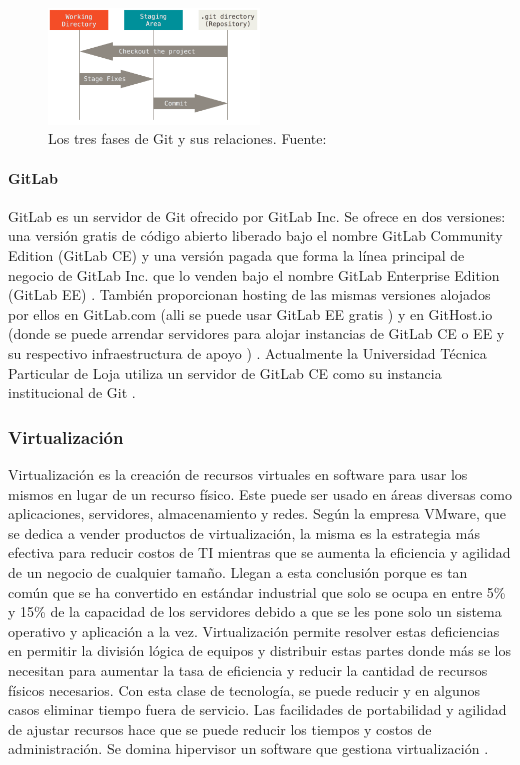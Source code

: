 \begin{figure}
  \begin{center}
      \includegraphics[width=0.5\textwidth]{Figures/git-fases.png}
  \end{center}
  \caption{Los tres fases de Git y sus relaciones. Fuente: \citep{PROGIT-Git-Intro}}
  \label{Git-Fases}
\end{figure}

\paragraph{GitLab}
GitLab es un servidor de Git ofrecido por GitLab Inc. Se ofrece en dos versiones: una versión gratis \citep{GitLab-Products} de código abierto liberado bajo el nombre GitLab Community Edition (GitLab CE) y una versión pagada que forma la línea principal de negocio de GitLab Inc. que lo venden bajo el nombre GitLab Enterprise Edition (GitLab EE) \citep{GitLab-About}. También proporcionan hosting de las mismas versiones alojados por ellos en GitLab.com (alli se puede usar GitLab EE gratis \citep{GitLab-GitLab.com} \citep{GitLab-Products}) y en GitHost.io (donde se puede arrendar servidores para alojar instancias de GitLab CE o EE y su respectivo infraestructura de apoyo \citep{GitHost.io}) \citep{GitLab-About}. Actualmente la Universidad Técnica Particular de Loja utiliza un servidor de GitLab CE como su instancia institucional de Git \citep{UTPL-GitLab}.

\subsubsection{Virtualización}
Virtualización es la creación de recursos virtuales en software para usar los mismos en lugar de un recurso físico. Este puede ser usado en áreas diversas como aplicaciones, servidores, almacenamiento y redes. Según la empresa VMware, que se dedica a vender productos de virtualización, la misma es la estrategia más efectiva para reducir costos de TI mientras que se aumenta la eficiencia y agilidad de un negocio de cualquier tamaño. Llegan a esta conclusión porque es tan común que se ha convertido en estándar industrial que solo se ocupa en entre 5\% y 15\% de la capacidad de los servidores debido a que se les pone solo un sistema operativo y aplicación a la vez. Virtualización permite resolver estas deficiencias en permitir la división lógica de equipos y distribuir estas partes donde más se los necesitan para aumentar la tasa de eficiencia y reducir la cantidad de recursos físicos necesarios. Con esta clase de tecnología, se puede reducir y en algunos casos eliminar tiempo fuera de servicio. Las facilidades de portabilidad y agilidad de ajustar recursos hace que se puede reducir los tiempos y costos de administración. Se domina hipervisor un software que gestiona virtualización \citep{VMWare-Virtualization}.


